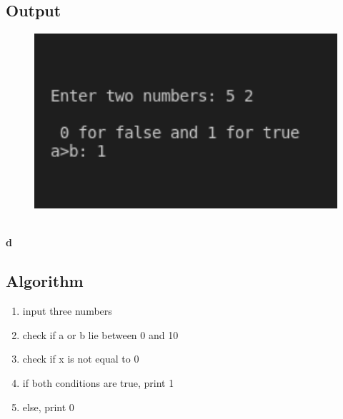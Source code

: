 \documentclass[12pt]{article}
\begin{document}
\subsection{Output}
\begin{figure}[h]
    \centering
    \includegraphics[width=1.0\textwidth]{4c.png}
\end{figure}\\ \newline
\newpage
\textbf{d}
\subsection{Algorithm}
\begin{enumerate}
    \item input three numbers
    \item check if a or b lie between 0 and 10
    \item check if x is not equal to 0
    \item if both conditions are true, print 1
    \item else, print 0
\end{enumerate}
\end{document}
